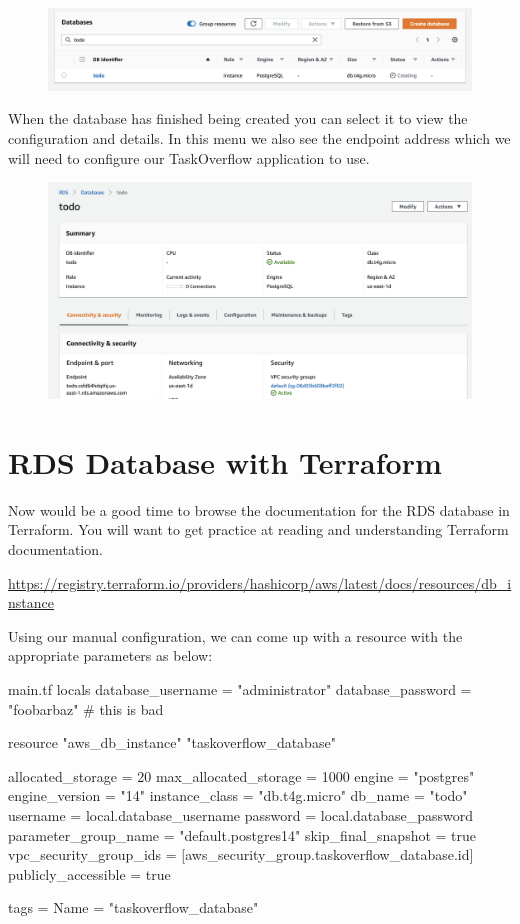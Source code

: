 \documentclass{csse4400}
\begin{document}
\begin{figure}[H]
  \includegraphics[width=\textwidth]{images/aws_4}
\end{figure}

When the database has finished being created you can select it to view the configuration and details.
In this menu we also see the endpoint address which we will need to configure our TaskOverflow application to use.

\begin{figure}[H]
  \includegraphics[width=\textwidth]{images/aws_5}
\end{figure}

\section{RDS Database with Terraform}

Now would be a good time to browse the documentation for the RDS database in Terraform.
You will want to get practice at reading and understanding Terraform documentation.

\noindent \url{https://registry.terraform.io/providers/hashicorp/aws/latest/docs/resources/db_instance}

Using our manual configuration, we can come up with a resource with the appropriate parameters as below:

\begin{code}[language=terraform,numbers=none]{main.tf}
locals {
  database_username = "administrator"
  database_password = "foobarbaz" # this is bad
}

resource "aws_db_instance" "taskoverflow_database" {
  allocated_storage      = 20
  max_allocated_storage  = 1000
  engine                 = "postgres"
  engine_version         = "14"
  instance_class         = "db.t4g.micro"
  db_name                = "todo"
  username               = local.database_username
  password               = local.database_password
  parameter_group_name   = "default.postgres14"
  skip_final_snapshot    = true
  vpc_security_group_ids = [aws_security_group.taskoverflow_database.id]
  publicly_accessible    = true

  tags = {
    Name = "taskoverflow_database"
  }
}
\end{code}
\end{document}
